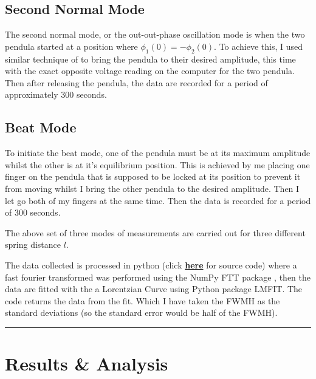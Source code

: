 \documentclass[aps,prl,reprint,10pt,amsmath,amssymb,superscriptaddress,a4paper]{revtex4-2}
\begin{document}
\subsection{Second Normal Mode}
The second normal mode, or the out-out-phase oscillation mode is when the two pendula started at a position where $\phi_1(0) = - \phi_2(0).$ To achieve this, I used similar technique of to bring the pendula to their desired amplitude, this time with the exact opposite voltage reading on the computer for the two pendula. Then after releasing the pendula, the data are recorded for a period of approximately 300 seconds.

\subsection{Beat Mode}
To initiate the beat mode, one of the pendula must be at its maximum amplitude whilst the other is at it's equilibrium position. This is achieved by me placing one finger on the pendula that is supposed to be locked at its position to prevent it from moving whilst I bring the other pendula to the desired amplitude. Then I let go both of my fingers at the same time. Then the data is recorded for a period of 300 seconds.

The above set of three modes of measurements are carried out for three different spring distance $l$. 

The data collected is processed in python (click \href{https://github.com/jojounderscorejo/CheatSheetRepo/blob/main/Otherthings/PHYS2113%20CP%20LAB/code/CP%20data%20analysis-checkpoint.ipynb}{\textbf{here}} for source code) where a fast fourier transformed was performed using the NumPy FTT package \cite{harris2020array}, then the data are fitted with the a Lorentzian Curve using Python package LMFIT\cite{lmfit}. The code returns the data from the fit. Which I have taken the FWMH as the standard deviations (so the standard error would be half of the FWMH). 
\par\noindent\rule{\linewidth}{0.4pt}

\section{Results \& Analysis}
\end{document}
